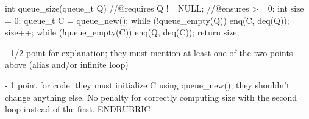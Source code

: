 \begin{parts}
int queue_size(queue_t Q)
//@requires Q != NULL;
//@ensures \result >= 0;
{
  int size = 0;
  queue_t C = queue_new();
  while (!queue_empty(Q)) {
    enq(C, deq(Q));
    size++;
  }
  while (!queue_empty(C)) enq(Q, deq(C));
  return size;
}

   - 1/2 point for explanation; they must mention at least one of the
     two points above (alias and/or infinite loop)

   - 1 point for code: they must initialize C using queue_new();
     they shouldn't change anything else. No penalty for correctly
     computing size with the second loop instead of the first.
ENDRUBRIC

\end{parts}

\egroup
